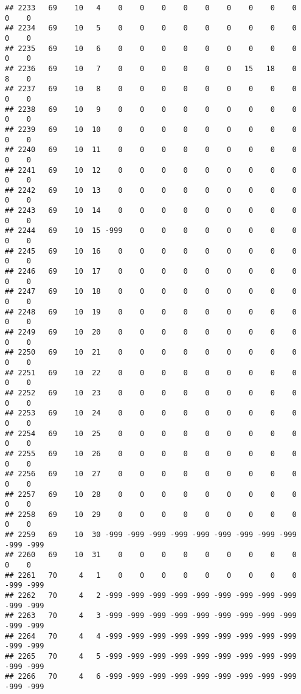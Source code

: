 \documentclass[]{article}
\begin{document}
\begin{verbatim}
## 2233   69    10   4    0    0    0    0    0    0    0    0    0    0    0
## 2234   69    10   5    0    0    0    0    0    0    0    0    0    0    0
## 2235   69    10   6    0    0    0    0    0    0    0    0    0    0    0
## 2236   69    10   7    0    0    0    0    0    0   15   18    0    8    0
## 2237   69    10   8    0    0    0    0    0    0    0    0    0    0    0
## 2238   69    10   9    0    0    0    0    0    0    0    0    0    0    0
## 2239   69    10  10    0    0    0    0    0    0    0    0    0    0    0
## 2240   69    10  11    0    0    0    0    0    0    0    0    0    0    0
## 2241   69    10  12    0    0    0    0    0    0    0    0    0    0    0
## 2242   69    10  13    0    0    0    0    0    0    0    0    0    0    0
## 2243   69    10  14    0    0    0    0    0    0    0    0    0    0    0
## 2244   69    10  15 -999    0    0    0    0    0    0    0    0    0    0
## 2245   69    10  16    0    0    0    0    0    0    0    0    0    0    0
## 2246   69    10  17    0    0    0    0    0    0    0    0    0    0    0
## 2247   69    10  18    0    0    0    0    0    0    0    0    0    0    0
## 2248   69    10  19    0    0    0    0    0    0    0    0    0    0    0
## 2249   69    10  20    0    0    0    0    0    0    0    0    0    0    0
## 2250   69    10  21    0    0    0    0    0    0    0    0    0    0    0
## 2251   69    10  22    0    0    0    0    0    0    0    0    0    0    0
## 2252   69    10  23    0    0    0    0    0    0    0    0    0    0    0
## 2253   69    10  24    0    0    0    0    0    0    0    0    0    0    0
## 2254   69    10  25    0    0    0    0    0    0    0    0    0    0    0
## 2255   69    10  26    0    0    0    0    0    0    0    0    0    0    0
## 2256   69    10  27    0    0    0    0    0    0    0    0    0    0    0
## 2257   69    10  28    0    0    0    0    0    0    0    0    0    0    0
## 2258   69    10  29    0    0    0    0    0    0    0    0    0    0    0
## 2259   69    10  30 -999 -999 -999 -999 -999 -999 -999 -999 -999 -999 -999
## 2260   69    10  31    0    0    0    0    0    0    0    0    0    0    0
## 2261   70     4   1    0    0    0    0    0    0    0    0    0 -999 -999
## 2262   70     4   2 -999 -999 -999 -999 -999 -999 -999 -999 -999 -999 -999
## 2263   70     4   3 -999 -999 -999 -999 -999 -999 -999 -999 -999 -999 -999
## 2264   70     4   4 -999 -999 -999 -999 -999 -999 -999 -999 -999 -999 -999
## 2265   70     4   5 -999 -999 -999 -999 -999 -999 -999 -999 -999 -999 -999
## 2266   70     4   6 -999 -999 -999 -999 -999 -999 -999 -999 -999 -999 -999

\end{verbatim}
\end{document}
